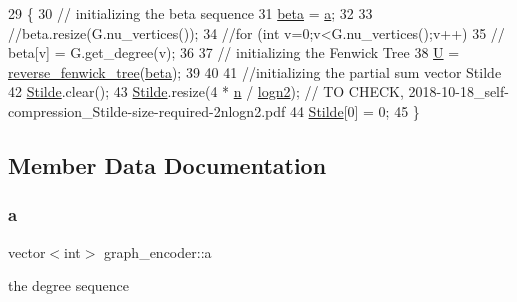 \begin{DoxyCode}
29 \{
30   \textcolor{comment}{// initializing the beta sequence}
31   \hyperlink{classgraph__encoder_a40880adecfd63fb86e94b4b0fc3f6bc2}{beta} = \hyperlink{classgraph__encoder_a56eb5cf480ae5c2fca9f3a45f2ffd4f1}{a}; 
32 
33   \textcolor{comment}{//beta.resize(G.nu\_vertices());}
34   \textcolor{comment}{//for (int v=0;v<G.nu\_vertices();v++)}
35   \textcolor{comment}{//  beta[v] = G.get\_degree(v);  }
36 
37   \textcolor{comment}{// initializing the Fenwick Tree}
38   \hyperlink{classgraph__encoder_a3314c40920f2ee132958a6b0ce7e7995}{U} = \hyperlink{classreverse__fenwick__tree}{reverse\_fenwick\_tree}(\hyperlink{classgraph__encoder_a40880adecfd63fb86e94b4b0fc3f6bc2}{beta});
39 
40 
41   \textcolor{comment}{//initializing the partial sum vector Stilde}
42   \hyperlink{classgraph__encoder_a342688a3fdee511b7fae3f155cfb10cf}{Stilde}.clear();
43   \hyperlink{classgraph__encoder_a342688a3fdee511b7fae3f155cfb10cf}{Stilde}.resize(4 * \hyperlink{classgraph__encoder_a7fedc9ace19e34abb32f1851c8597591}{n} / \hyperlink{classgraph__encoder_a27fde3a95a280304877b1e37fc4d8553}{logn2}); \textcolor{comment}{// TO CHECK,
       2018-10-18\_self-compression\_Stilde-size-required-2nlogn2.pdf}
44   \hyperlink{classgraph__encoder_a342688a3fdee511b7fae3f155cfb10cf}{Stilde}[0] = 0;
45 \}
\end{DoxyCode}


\subsection{Member Data Documentation}
\mbox{\label{classgraph__encoder_a56eb5cf480ae5c2fca9f3a45f2ffd4f1}} 
\subsubsection{\texorpdfstring{a}{a}}
{\footnotesize\ttfamily vector$<$int$>$ graph\+\_\+encoder\+::a\hspace{0.3cm}{\ttfamily [private]}}



the degree sequence 

\mbox{\label{classgraph__encoder_a40880adecfd63fb86e94b4b0fc3f6bc2}} 
